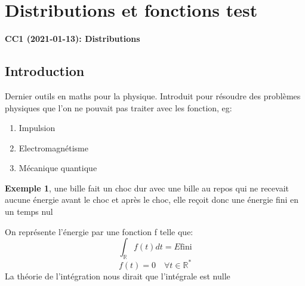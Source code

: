 \documentclass[12pt,a4paper]{report}
\author{Malo Kerebel}
\begin{document}
\begin{titlepage}

\end{titlepage}

\tableofcontents

\chapter{Distributions et fonctions test}
\begin{center}
\textbf{CC1 (2021-01-13): Distributions}
\end{center}

\section{Introduction}

Dernier outils en maths pour la physique. Introduit pour résoudre des problèmes physiques que l'on ne pouvait pas traiter avec les fonction, eg:
\begin{enumerate}
	\item Impulsion
	\item Electromagnétisme
	\item Mécanique quantique
\end{enumerate}

\textbf{Exemple 1}, une bille fait un choc dur avec une bille au repos qui ne recevait aucune énergie avant le choc et après le choc, elle reçoit donc une énergie fini en un temps nul

On représente l'énergie par une fonction f telle que:
\[
	\int_{\mathbb{R}} f(t) dt = E \text{fini}
\]
\[
	f(t) = 0 \quad \forall t \in \mathbb{R}^*
\]
La théorie de l'intégration nous dirait que l'intégrale est nulle
\end{document}
